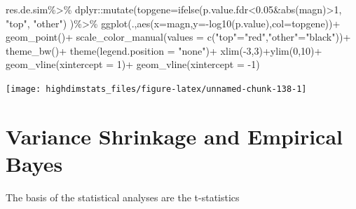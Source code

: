 \documentclass[
]{book}
\newenvironment{Shaded}{\begin{snugshade}}{\end{snugshade}}
\newcommand{\AttributeTok}[1]{\textcolor[rgb]{0.77,0.63,0.00}{#1}}
\newcommand{\DecValTok}[1]{\textcolor[rgb]{0.00,0.00,0.81}{#1}}
\newcommand{\FloatTok}[1]{\textcolor[rgb]{0.00,0.00,0.81}{#1}}
\newcommand{\FunctionTok}[1]{\textcolor[rgb]{0.00,0.00,0.00}{#1}}
\newcommand{\NormalTok}[1]{#1}
\newcommand{\OtherTok}[1]{\textcolor[rgb]{0.56,0.35,0.01}{#1}}
\newcommand{\SpecialCharTok}[1]{\textcolor[rgb]{0.00,0.00,0.00}{#1}}
\newcommand{\StringTok}[1]{\textcolor[rgb]{0.31,0.60,0.02}{#1}}
\begin{document}
\begin{Shaded}
\begin{Highlighting}[]
\NormalTok{res.de.sim}\SpecialCharTok{\%\textgreater{}\%}
\NormalTok{  dplyr}\SpecialCharTok{::}\FunctionTok{mutate}\NormalTok{(}\AttributeTok{topgene=}\FunctionTok{ifelse}\NormalTok{(p.value.fdr}\SpecialCharTok{\textless{}}\FloatTok{0.05}\SpecialCharTok{\&}\FunctionTok{abs}\NormalTok{(magn)}\SpecialCharTok{\textgreater{}}\DecValTok{1}\NormalTok{,}
                               \StringTok{"top"}\NormalTok{,}
                               \StringTok{"other"}\NormalTok{)}
\NormalTok{                )}\SpecialCharTok{\%\textgreater{}\%}
  \FunctionTok{ggplot}\NormalTok{(.,}\FunctionTok{aes}\NormalTok{(}\AttributeTok{x=}\NormalTok{magn,}\AttributeTok{y=}\SpecialCharTok{{-}}\FunctionTok{log10}\NormalTok{(p.value),}\AttributeTok{col=}\NormalTok{topgene))}\SpecialCharTok{+}
  \FunctionTok{geom\_point}\NormalTok{()}\SpecialCharTok{+}
  \FunctionTok{scale\_color\_manual}\NormalTok{(}\AttributeTok{values =} \FunctionTok{c}\NormalTok{(}\StringTok{"top"}\OtherTok{=}\StringTok{"red"}\NormalTok{,}\StringTok{"other"}\OtherTok{=}\StringTok{"black"}\NormalTok{))}\SpecialCharTok{+}
  \FunctionTok{theme\_bw}\NormalTok{()}\SpecialCharTok{+}
  \FunctionTok{theme}\NormalTok{(}\AttributeTok{legend.position =} \StringTok{"none"}\NormalTok{)}\SpecialCharTok{+}
  \FunctionTok{xlim}\NormalTok{(}\SpecialCharTok{{-}}\DecValTok{3}\NormalTok{,}\DecValTok{3}\NormalTok{)}\SpecialCharTok{+}\FunctionTok{ylim}\NormalTok{(}\DecValTok{0}\NormalTok{,}\DecValTok{10}\NormalTok{)}\SpecialCharTok{+}
  \FunctionTok{geom\_vline}\NormalTok{(}\AttributeTok{xintercept =} \DecValTok{1}\NormalTok{)}\SpecialCharTok{+}
  \FunctionTok{geom\_vline}\NormalTok{(}\AttributeTok{xintercept =} \SpecialCharTok{{-}}\DecValTok{1}\NormalTok{)}
\end{Highlighting}
\end{Shaded}

\begin{center}\texttt{[image: highdimstats\_files/figure-latex/unnamed-chunk-138-1]} \end{center}

\hypertarget{variance-shrinkage-and-empirical-bayes}{%
\section{Variance Shrinkage and Empirical Bayes}\label{variance-shrinkage-and-empirical-bayes}}

The basis of the statistical analyses are the t-statistics
\end{document}
